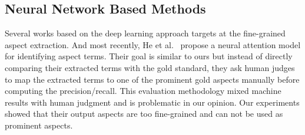 
\subsection{Neural Network Based Methods}
Several works \cite{poria2016aspect,wang2016recursive} 
based on the deep learning approach targets at the fine-grained aspect extraction.
And most recently, He et al.~\cite{DBLP:conf/acl/HeLND17}  propose a neural attention model 
for identifying aspect terms. Their goal is similar to ours but instead of
directly comparing their extracted terms with the gold standard, they ask
human judges to map the extracted terms to one of the prominent gold 
aspects manually before computing the precision/recall. This evaluation 
methodology mixed machine results with human judgment and is problematic
in our opinion. 
Our experiments showed that their output aspects are too fine-grained and 
can not be used as prominent aspects.
%


